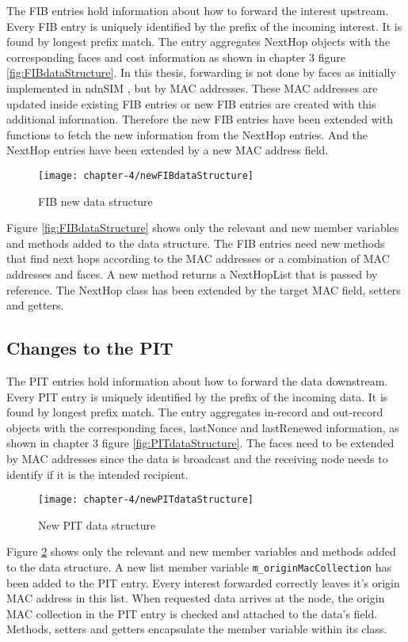 The FIB entries hold information about how to forward the interest upstream. Every FIB entry is uniquely identified by the prefix of the incoming interest. It is found by longest prefix match. The entry aggregates NextHop objects with the corresponding faces and cost information as shown in chapter 3 figure \ref{fig:FIBdataStructure}.
In this thesis, forwarding is not done by faces as initially implemented in ndnSIM \cite{Afanasyev16}, but by MAC addresses. These MAC addresses are updated inside existing FIB entries or new FIB entries are created with this additional information. Therefore the new FIB entries have been extended with functions to fetch the new information from the NextHop entries. And the NextHop entries have been extended by a new MAC address field.

\begin{figure}[H]
  \centering
  \texttt{[image: chapter-4/newFIBdataStructure]}
  \caption{FIB new data structure}
  \label{fig:newFIBdataStructure}
\end{figure}

Figure \ref{fig:FIBdataStructure} shows only the relevant and new member variables and methods added to the data structure. The FIB entries need new methods that find next hops according to the MAC addresses or a combination of MAC addresses and faces. A new method returns a NextHopList that is passed by reference. The NextHop class has been extended by the target MAC field, setters and getters.

\newpage

\subsection{Changes to the PIT}

The PIT entries hold information about how to forward the data downstream. Every PIT entry is uniquely identified by the prefix of the incoming data. It is found by longest prefix match. The entry aggregates in-record and out-record objects with the corresponding faces, lastNonce and lastRenewed information, as shown in chapter 3 figure \ref{fig:PITdataStructure}. The faces need to be extended by MAC addresses since the data is broadcast and the receiving node needs to identify if it is the intended recipient.

\begin{figure}[H]
  \centering
  \texttt{[image: chapter-4/newPITdataStructure]}
  \caption{New PIT data structure}
  \label{fig:newPITdataStructure}
\end{figure}

Figure \ref{fig:newPITdataStructure} shows only the relevant and new member variables and methods added to the data structure. A new list member variable \texttt{m\_originMacCollection} has been added to the PIT entry. Every interest forwarded correctly leaves it's origin MAC address in this list. When requested data arrives at the node, the origin MAC collection in the PIT entry is checked and attached to the data's field. Methods, setters and getters encapsulate the member variable within its class.






